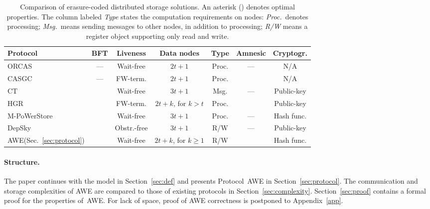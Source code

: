 \documentclass[oribibl]{llncs}
\theoremstyle{definition-boldhead}
\newcommand{\NAME}{AWE\xspace}
\newcommand{\nodes}{nodes\xspace}
\begin{document}
\begin{table}
  \centering
  \begin{tabular}{|l||c|c|c|c|c|c|}
    \hline
    {\bf Protocol} & {\bf BFT} & {\bf Liveness} & {\bf Data \nodes} &
      {\bf Type} & {\bf Amnesic} & {\bf Cryptogr.} \\ \hline
    ORCAS~\cite{dugule08} & --- & Wait-free & $2t+1$ & Proc. &
      ---  & N/A \\ \hline
    CASGC~\cite{clmm13}   & --- & FW-term.  & $2t+1$ & Proc. &
      \Y \T   & N/A \\ \hline
    CT~\cite{cactes06}    & \Y \T & Wait-free \T & $3t+1$ & Msg. &
      ---  & Public-key \\ \hline
    HGR~\cite{hegare07b}  & \Y \T & FW-term.  & $2t+k$, for $k > t$ & Proc. &
      \Y \T & Public-key \\ \hline
    M-PoWerStore~\cite{dklmsv13}  & \Y \T & Wait-free \T & $3t+1$ & Proc. &
      ---  & Hash func. \T \\ \hline
    DepSky~\cite{bcqas11} & \Y \T & Obstr.-free  & $3t+1$ & R/W \T &
      ---  & Public-key \\ \hline
    \NAME (Sec.~\ref{sec:protocol})
                          & \Y \T & Wait-free \T & $2t+k$, for $k \geq 1$ \T &
      R/W \T & \Y \T & Hash func. \T \\ \hline
  \end{tabular}
  \caption{Comparison of erasure-coded distributed storage solutions.
    An asterisk (\T) denotes optimal properties. The column labeled
    \emph{Type} states the computation requirements on \nodes:
    \emph{Proc.}\ denotes processing;
\emph{Msg.}\ means sending messages to other
    \nodes, in addition to processing;
    \emph{R/W} means a register object supporting only read and write.}
  \label{tab:comparison}
\if\submit\yes
\vspace*{-4mm}
\fi
\end{table}


\paragraph{Structure.}

The paper continues with the model in Section~\ref{sec:def} and
presents Protocol~\NAME in Section~\ref{sec:protocol}.  The
communication and storage complexities of \NAME are compared
to those of existing protocols in Section~\ref{sec:complexity}.
\if\submit\no
Section~\ref{sec:proof} contains a formal proof for the properties
of~\NAME.
\else
For lack of space, proof of \NAME correctness is postponed to Appendix~\ref{app}.
\fi
\end{document}
